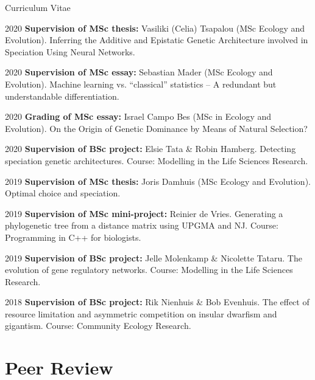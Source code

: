 \documentclass[11pt,a4paper]{article}
\begin{document}
\begin{cv}{Curriculum Vitae}
        \begin{cvlist}{}

            \item[2020] \textbf{Supervision of MSc thesis:} Vasiliki (Celia) Tsapalou (MSc Ecology and Evolution).
			Inferring the Additive and Epistatic Genetic Architecture involved in Speciation Using Neural Networks.
			
			\item[2020] \textbf{Supervision of MSc essay:} Sebastian Mader (MSc Ecology and Evolution).
			Machine learning vs. “classical” statistics – A redundant but understandable differentiation.
			
			\item[2020] \textbf{Grading of MSc essay:} Israel Campo Bes (MSc in Ecology and Evolution).
			On the Origin of Genetic Dominance by Means of Natural Selection?
			
			\item[2020] \textbf{Supervision of BSc project:} Elsie Tata \& Robin Hamberg.
			Detecting speciation genetic architectures. Course: Modelling in the Life Sciences Research.
			
			\item[2019] \textbf{Supervision of MSc thesis:} Joris Damhuis (MSc Ecology and Evolution).
			Optimal choice and speciation.
			
			\item[2019] \textbf{Supervision of MSc mini-project:} Reinier de Vries.
			Generating a phylogenetic tree from a distance matrix using UPGMA and NJ. Course: Programming in C++ for biologists.
	
			\item[2019] \textbf{Supervision of BSc project:} Jelle Molenkamp \& Nicolette Tataru. The evolution of gene regulatory networks. Course: Modelling in the Life Sciences Research.
			
			\item[2018] \textbf{Supervision of BSc project:} Rik Nienhuis \& Bob Evenhuis. The effect of resource limitation and asymmetric competition on insular dwarfism and gigantism. Course: Community Ecology Research.

        \end{cvlist}
		
		\section{Peer Review}
		

\end{cv}
\end{document}
